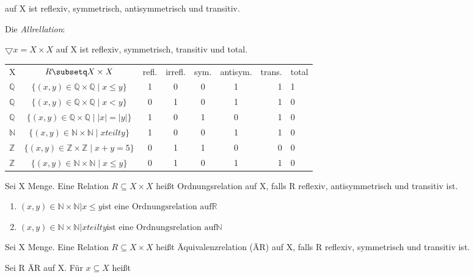\documentclass{../../meta/tudscript}
\begin{document}
auf X ist reflexiv, symmetrisch, antisymmetrisch und transitiv.

Die \emph{Allrellation}:

\(\bigtriangledown x = X \times X\) auf X ist reflexiv, symmetrisch,
transitiv und total.

\begin{tabular}{l c c c c c r}
X & \(R \subsetq X \times X\) & refl. & irrefl. & sym. & antisym. & trans. & total \\
\(\mathbb{Q}\) & \(\{(x,y) \in \mathbb{Q} \times \mathbb{Q} \mid x \leq y\}\) & 1 & 0 &0&1&1&1\\
\(\mathbb{Q}\) & \(\{(x,y) \in \mathbb{Q} \times \mathbb{Q} \mid x < y\}\) &0&1&0&1&1&0\\
\(\mathbb{Q}\) & \(\{(x,y) \in \mathbb{Q} \times \mathbb{Q} \mid |x| = |y|\}\)&1&0&1&0&1&0\\
\(\mathbb{N}\) & \(\{(x,y) \in \mathbb{N} \times \mathbb{N} \mid x teilt y\}\)&1&0&0&1&1&0\\
\(\mathbb{Z}\) & \(\{(x,y) \in \mathbb{Z} \times \mathbb{Z} \mid x + y = 5\}\) &0&1&1&0&0&0\\
\(\mathbb{Z}\) &\(\{(x,y) \in \mathbb{N} \times \mathbb{N} \mid x \leq y \}\) &0&1&0&1&1&0\\
\end{tabular}


Sei X Menge. Eine Relation \(R \subseteq X \times X\) heißt
Ordnungsrelation auf X, falls R reflexiv, antisymmetrisch und transitiv
ist.


\begin{enumerate}
\def\labelenumi{\arabic{enumi}.}

\item
	\({(x,y) \in \mathbb{N} \times \mathbb{N} | x \leq y} \text{ist eine Ordnungsrelation auf} \mathbb{R}\)
\item
	\({(x,y) \in \mathbb{N} \times \mathbb{N} | x teilt y} \text{ist eine Ordnungsrelation auf} \mathbb{N}\)
\end{enumerate}


Sei X Menge. Eine Relation \(R \subseteq X \times X\) heißt
Äquivalenzrelation (ÄR) auf X, falls R reflexiv, symmetrisch und
transitiv ist.

Sei R ÄR auf X. Für \(x \subseteq X\) heißt
\end{document}
